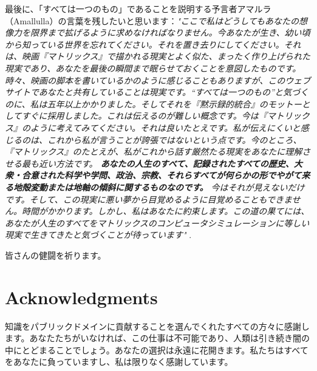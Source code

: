 \documentclass[10pt,twocolumn,letterpaper]{article}
\begin{document}
最後に、「すべては一つのもの」であることを説明する予言者アマルラ（Amallulla）の言葉を残したいと思います：\textit{"ここで私はどうしてもあなたの想像力を限界まで拡げるように求めなければなりません。今あなたが生き、幼い頃から知っている世界を忘れてください。それを置き去りにしてください。それは、映画『マトリックス』で描かれる現実とよく似た、まったく作り上げられた現実であり、あなたを最後の瞬間まで眠らせておくことを意図したものです。時々、映画の脚本を書いているかのように感じることもありますが、このウェブサイトであなたと共有していることは現実です。“すべては一つのもの”と気づくのに、私は五年以上かかりました。そしてそれを『黙示録的統合』のモットーとしてすぐに採用しました。これは伝えるのが難しい概念です。今は『マトリックス』のように考えてみてください。それは良いたとえです。私が伝えにくいと感じるのは、これから私が言うことが誇張ではないという点です。今のところ、『マトリックス』のたとえが、私がこれから話す厳然たる現実をあなたに理解させる最も近い方法です。 \textbf{あなたの人生のすべて、記録されたすべての歴史、大衆・合意された科学や学問、政治、宗教、それらすべてが何らかの形でやがて来る地殻変動または地軸の傾斜に関するものなのです。} 今はそれが見えないだけです。そして、この現実に悪い夢から目覚めるように目覚めることもできません。時間がかかります。しかし、私はあなたに約束します。この道の果てには、あなたが人生のすべてをマトリックスのコンピュータシミュレーションに等しい現実で生きてきたと気づくことが待っています"} \cite{33,34}.

皆さんの健闘を祈ります。

\section{Acknowledgments}

知識をパブリックドメインに貢献することを選んでくれたすべての方々に感謝します。あなたたちがいなければ、この仕事は不可能であり、人類は引き続き闇の中にとどまることでしょう。あなたの選択は永遠に花開きます。私たちはすべてをあなたに負っていますし、私は限りなく感謝しています。

\clearpage
\twocolumn
{\small
\renewcommand{\refname}{参考文献}


}
\end{document}
